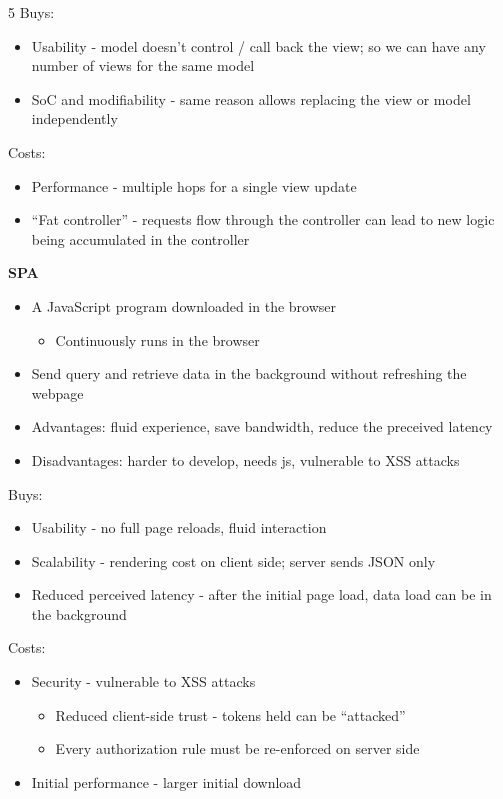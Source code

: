 \documentclass[landscape,a4paper]{extarticle}
\begin{document}
\begin{multicols*}{5}
    Buys:
    \begin{itemize}
        \item Usability - model doesn't control / call back the view; so we can have any number of views for the same model
        \item SoC and modifiability - same reason allows replacing the view or model independently
    \end{itemize}

    Costs:
    \begin{itemize}
        \item Performance - multiple hops for a single view update
        \item ``Fat controller'' - requests flow through the controller can lead to new logic being accumulated in the controller
    \end{itemize}

    \textbf{SPA}
    
    \begin{itemize}
        \item A JavaScript program downloaded in the browser
        \begin{itemize}
            \item Continuously runs in the browser
        \end{itemize}
        \item Send query and retrieve data in the background without refreshing the webpage
        \item Advantages: fluid experience, save bandwidth, reduce the preceived latency
        \item Disadvantages: harder to develop, needs js, vulnerable to XSS attacks
    \end{itemize}

    Buys:
    \begin{itemize}
        \item Usability - no full page reloads, fluid interaction
        \item Scalability - rendering cost on client side; server sends JSON only
        \item Reduced perceived latency - after the initial page load, data load can be in the background
    \end{itemize}

    Costs:
    \begin{itemize}
        \item Security - vulnerable to XSS attacks
        \begin{itemize}
            \item Reduced client-side trust - tokens held can be ``attacked''
            \item Every authorization rule must be re-enforced on server side
        \end{itemize}
        \item Initial performance - larger initial download
    \end{itemize}


\end{multicols*}
\end{document}
